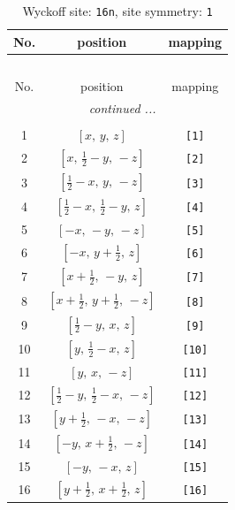\documentclass[fleqn,8pt]{jsarticle}
\begin{document}
\begin{longtable}{ccc}
\caption{Wyckoff site: {\tt 16n}, site symmetry: {\tt 1}}
 \\
 \hline \hline
No. & position & mapping \\ \hline \endfirsthead

\multicolumn{2}{l}{\tablename\ \thetable{}} \\
 \hline \hline
No. & position & mapping \\ \hline \endhead

 \hline \hline
\multicolumn{2}{r}{\footnotesize\it continued ...} \\ \endfoot

 \hline \hline
\multicolumn{2}{r}{} \\ \endlastfoot

1 & $\left[ x,\, y,\, z \right]$ & {\tt [1]} \\ \hline
2 & $\left[ x,\, \frac{1}{2} - y,\, - z \right]$ & {\tt [2]} \\ \hline
3 & $\left[ \frac{1}{2} - x,\, y,\, - z \right]$ & {\tt [3]} \\ \hline
4 & $\left[ \frac{1}{2} - x,\, \frac{1}{2} - y,\, z \right]$ & {\tt [4]} \\ \hline
5 & $\left[ - x,\, - y,\, - z \right]$ & {\tt [5]} \\ \hline
6 & $\left[ - x,\, y + \frac{1}{2},\, z \right]$ & {\tt [6]} \\ \hline
7 & $\left[ x + \frac{1}{2},\, - y,\, z \right]$ & {\tt [7]} \\ \hline
8 & $\left[ x + \frac{1}{2},\, y + \frac{1}{2},\, - z \right]$ & {\tt [8]} \\ \hline
9 & $\left[ \frac{1}{2} - y,\, x,\, z \right]$ & {\tt [9]} \\ \hline
10 & $\left[ y,\, \frac{1}{2} - x,\, z \right]$ & {\tt [10]} \\ \hline
11 & $\left[ y,\, x,\, - z \right]$ & {\tt [11]} \\ \hline
12 & $\left[ \frac{1}{2} - y,\, \frac{1}{2} - x,\, - z \right]$ & {\tt [12]} \\ \hline
13 & $\left[ y + \frac{1}{2},\, - x,\, - z \right]$ & {\tt [13]} \\ \hline
14 & $\left[ - y,\, x + \frac{1}{2},\, - z \right]$ & {\tt [14]} \\ \hline
15 & $\left[ - y,\, - x,\, z \right]$ & {\tt [15]} \\ \hline
16 & $\left[ y + \frac{1}{2},\, x + \frac{1}{2},\, z \right]$ & {\tt [16]} \\
\end{longtable}
\end{document}
